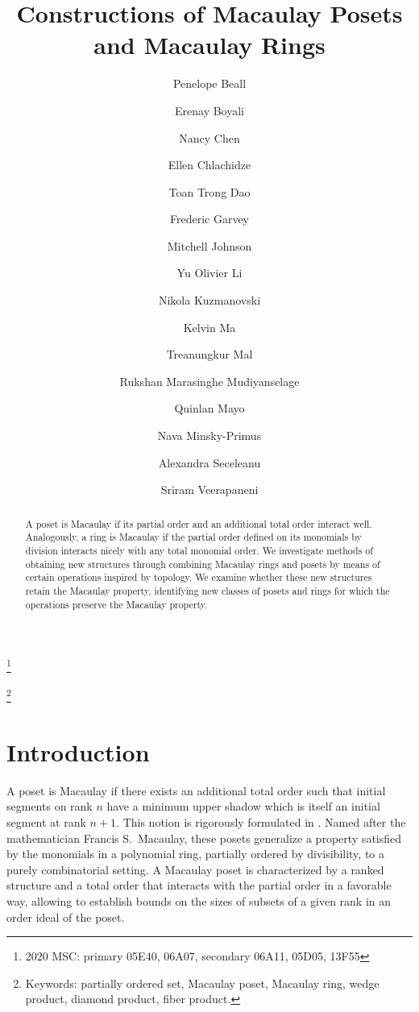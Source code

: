 \documentclass[11pt, reqno]{amsart}
\title{Constructions of Macaulay Posets and Macaulay Rings}
\author[]{Penelope Beall}
\author[]{Erenay Boyali}
\author[]{Nancy Chen}
\author[]{Ellen Chlachidze}
\author[]{Toan Trong Dao}
\author[]{Frederic Garvey}
\author[]{Mitchell Johnson}
\author[]{Yu Olivier Li}
\author[]{Nikola Kuzmanovski}
\author[]{Kelvin Ma}
\author[]{Treanungkur Mal}
\author[]{Rukshan Marasinghe Mudiyanselage}
\author[]{Quinlan Mayo}
\author[]{Nava Minsky-Primus}
\author[]{Alexandra Seceleanu}
\author[]{Sriram Veerapaneni}
\theoremstyle{plain} %
\theoremstyle{definition}
\theoremstyle{remark}
\numberwithin{equation}{section}  %
\begin{document}
\thanks{2020 MSC: primary	05E40, 06A07,  secondary	06A11, 	05D05,  13F55}

\thanks{Keywords: partially ordered set, Macaulay poset, Macaulay ring, wedge product, diamond product, fiber product.}

\begin{abstract}
    A poset is Macaulay if its partial order and an additional total order interact well. Analogously, a ring is Macaulay if the partial order defined on its monomials by division interacts nicely with any total monomial order.  We investigate methods of obtaining new structures through combining Macaulay rings and posets by means of certain operations inspired by topology. We  examine whether these new structures retain the Macaulay property, identifying new classes of posets and rings for which the operations preserve the Macaulay property. 
\end{abstract}

\maketitle
\setcounter{tocdepth}{1}
\tableofcontents

\vspace{-2em}
\section{Introduction}

A poset is Macaulay if there exists an additional total order such that initial segments on rank \(n\) have a minimum upper shadow which is itself an initial segment at rank \(n + 1\).  This notion is rigorously formulated in .
Named after the mathematician Francis S.~Macaulay, these posets generalize a property satisfied by  the monomials in a polynomial ring, partially ordered by divisibility, to a purely combinatorial setting. A Macaulay poset is characterized by a ranked structure and a total order that interacts with the partial order in a favorable way, allowing to establish bounds on the sizes of subsets of a given rank in an order ideal of the poset. 
\end{document}
